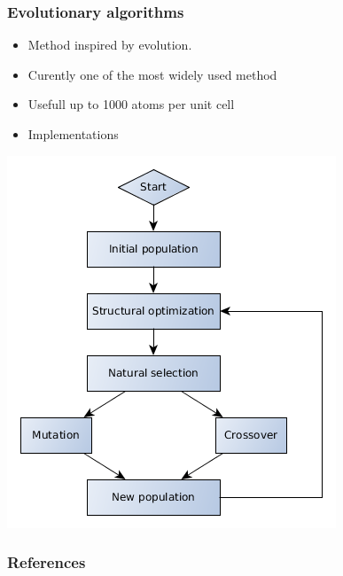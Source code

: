 \documentclass{beamer}
\begin{document}
\begin{frame}
  \frametitle{Evolutionary algorithms}
  \begin{minipage}[h]{0.49\textwidth}
    \begin{itemize}
      \item Method inspired by evolution.
      \item Curently one of the most widely used method
      \item Usefull up to 1000 atoms per unit cell
      \item Implementations\cite{avery2017,oganov2006}
    \end{itemize}
  \end{minipage}%
  \hfill%
  \begin{minipage}[h]{0.49\textwidth}
    \includegraphics[width=\textwidth]{figs/EA.png}
  \end{minipage}
\end{frame}

\begin{frame}
  \frametitle{References}
  \printbibliography
\end{frame}
\end{document}

